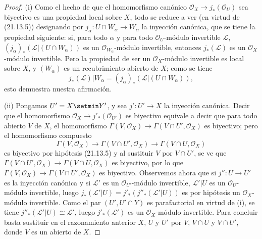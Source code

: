 \begin{proof}
(i) Como el hecho de que el homomorfismo canónico
$\mathcal O_X\to j_*(\mathcal O_U)$ sea biyectivo es una propiedad local sobre $X$,
todo se reduce a ver (en virtud de (21.13.5)) designando por
$j_\alpha:U\cap W_\alpha\to W_\alpha$ la inyección canónica, que se tiene la propiedad
siguiente: si, para todo $\alpha$ y para todo $\mathcal O_U$-módulo invertible
$\mathscr L$, $(j_\alpha)_*(\mathscr L|(U\cap W_\alpha))$ es un
$\mathcal O_{W_\alpha}$-módulo invertible, entonces $j_*(\mathscr L)$ es un
$\mathcal O_X$-módulo invertible. Pero la propiedad de ser un $\mathcal O_X$-módulo
invertible es local sobre $X$, y $(W_\alpha)$ es un recubrimiento abierto de $X$;
como se tiene
\[
  j_*(\mathscr L)|W_\alpha
  =(j_\alpha)_*(\mathscr L|(U\cap W_\alpha)),
\]
esto demuestra nuestra afirmación.

(ii) Pongamos $U'=X\setmin Y'$, y sea $j':U'\to X$ la inyección canónica. Decir que
el homomorfismo $\mathcal O_X\to j'_*(\mathcal O_{U'})$ es biyectivo equivale a decir
que para todo abierto $V$ de $X$, el homomorfismo
$\Gamma(V,\mathcal O_X)\to\Gamma(V\cap U',\mathcal O_X)$ es biyectivo; pero
el homomorfismo compuesto
\[
  \Gamma(V,\mathcal O_X)\longrightarrow\Gamma(V\cap U',\mathcal O_X)
  \longrightarrow\Gamma(V\cap U,\mathcal O_X)
\]
es biyectivo por hipótesis (21.13.5) y al sustituir $V$ por $V\cap U'$, se ve que
$\Gamma(V\cap U',\mathcal O_X)\to\Gamma(V\cap U,\mathcal O_X)$ es biyectivo, por lo que
$\Gamma(V,\mathcal O_X)\to\Gamma(V\cap U',\mathcal O_X)$ es biyectivo. Observemos ahora
que si $j'':U\to U'$ es la inyección canónica y si $\mathscr L'$ es un
$\mathcal O_{U'}$-módulo invertible, $\mathscr L'|U$ es un $\mathcal O_U$-módulo
invertible, luego
$j_*(\mathscr L'|U)=j'_*(j''_*(\mathscr L'|U))$ es por hipótesis un
$\mathcal O_X$-módulo invertible. Como el par $(U',U'\cap Y)$ es parafactorial
en virtud de (i), se tiene $j''_*(\mathscr L'|U)\cong\mathscr L'$, luego
$j'_*(\mathscr L')$ es un $\mathcal O_X$-módulo invertible. Para concluir basta
sustituir en el razonamiento anterior $X$, $U$ y $U'$ por $V$,
$V\cap U$ y $V\cap U'$, donde $V$ es un abierto de $X$.


\end{proof}
